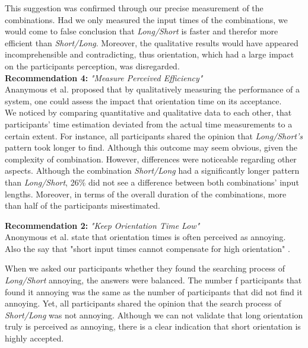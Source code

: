 This suggestion was confirmed through our precise measurement of the combinations. Had we only measured the input times of the combinations, we would come to false conclusion that \textit{Long/Short} is faster and therefor more efficient than \textit{Short/Long}. Moreover, the qualitative results would have appeared incomprehensible and contradicting, thus orientation, which had a large impact on the participants perception, was disregarded. \\

\textbf{Recommendation 4:} \textit{"Measure Perceived Efficiency"} \\
Ananymous et al. proposed that by qualitatively measuring the performance of a system, one could assess the impact that orientation time on its acceptance. \\

We noticed by comparing quantitative and qualitative data to each other, that participants' time estimation deviated from the actual time measurements to a certain extent. For instance, all participants shared the opinion that \textit{Long/Short's} pattern took longer to find. Although this outcome may seem obvious, given the complexity of combination. However, differences were noticeable regarding other aspects. Although the combination \textit{Short/Long} had a significantly longer pattern than \textit{Long/Short}, 26\% did not see a difference between both combinations' input lengths. Moreover, in terms of the overall duration of the combinations, more than half of the participants misestimated.



\textbf{Recommendation 2:} \textit{"Keep Orientation Time Low"} \\
Anonymous et al. \cite{anonymous} state that orientation times is often perceived as annoying. Also the say that "short input times cannot compensate for high orientation" \cite{anonymous}.

When we asked our participants whether they found the searching process of \textit{Long/Short} annoying, the answers were balanced. The number f participants that found it annoying was the same as the number of participants that did not find it annoying. Yet, all participants shared the opinion that the search process of \textit{Short/Long} was not annoying. Although we can not validate that long orientation truly is perceived as annoying, there is a clear indication that short orientation is highly accepted. \\

